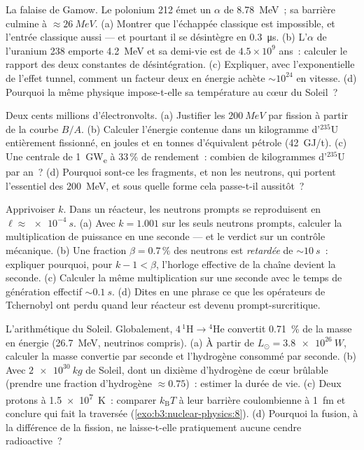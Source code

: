\begin{exercise}[$\star\star$]\label{exo:b3:nuclear-physics:8}
La falaise de Gamow. Le polonium 212 émet un $\alpha$ de
\qty{8.78}{MeV}~; sa barrière culmine à $\approx\qty{26}{MeV}$. (a)
Montrer que l'échappée classique est impossible, et l'entrée
classique aussi --- et pourtant il se désintègre en
\qty{0.3}{\micro s}. (b) L'$\alpha$ de l'uranium 238 emporte
\qty{4.2}{MeV} et sa demi-vie est de $4.5\times10^9$ ans~: calculer
le rapport des deux constantes de désintégration. (c) Expliquer, avec
l'exponentielle de l'effet tunnel, comment un facteur deux en énergie
achète $\sim10^{24}$ en vitesse. (d) Pourquoi la même physique
impose-t-elle sa température au cœur du Soleil~?
\end{exercise}

\begin{exercise}[$\star\star$]\label{exo:b3:nuclear-physics:9}
Deux cents millions d'électronvolts. (a) Justifier les
$\qty{200}{MeV}$ par fission à partir de la courbe $B/A$. (b)
Calculer l'énergie contenue dans un kilogramme d'$^{235}$U
entièrement fissionné, en joules et en tonnes d'équivalent pétrole
(\qty{42}{GJ/t}). (c) Une centrale de \qty{1}{GW_e} à 33\,\% de
rendement~: combien de kilogrammes d'$^{235}$U par an~? (d) Pourquoi
sont-ce les fragments, et non les neutrons, qui portent l'essentiel
des \qty{200}{MeV}, et sous quelle forme cela passe-t-il aussitôt~?
\end{exercise}

\begin{exercise}[$\star\star\star$]\label{exo:b3:nuclear-physics:10}
Apprivoiser $k$. Dans un réacteur, les neutrons prompts se
reproduisent en $\ell
\approx \qty{e-4}{s}$. (a) Avec $k = 1.001$ sur les seuls neutrons
prompts, calculer la multiplication de puissance en une seconde ---
et le verdict sur un contrôle mécanique. (b) Une fraction $\beta =
0.7\,\%$ des neutrons est \emph{retardée} de $\sim\qty{10}{s}$~:
expliquer pourquoi, pour $k - 1 < \beta$, l'horloge effective de la
chaîne devient la seconde. (c) Calculer la même multiplication sur
une seconde avec le temps de génération effectif
$\sim\qty{0.1}{s}$. (d) Dites en une phrase ce que les opérateurs de
Tchernobyl ont perdu quand leur réacteur est devenu
prompt-surcritique.
\end{exercise}

\begin{exercise}[$\star\star\star$]\label{exo:b3:nuclear-physics:11}
L'arithmétique du Soleil. Globalement,
$4\,^1\text{H} \to {}^4\text{He}$ convertit \qty{0.71}{\percent} de
la masse en énergie (\qty{26.7}{MeV}, neutrinos compris). (a) À
partir de $L_\odot =
\qty{3.8e26}{W}$, calculer la masse convertie par seconde et
l'hydrogène consommé par seconde. (b) Avec $\qty{2e30}{kg}$ de
Soleil, dont un dixième d'hydrogène de cœur brûlable (prendre une
fraction d'hydrogène $\approx0.75$)~: estimer la durée de vie. (c)
Deux protons à \qty{1.5e7}{K}~: comparer $k_{\text{B}}T$ à leur
barrière coulombienne à \qty{1}{fm} et conclure qui fait la traversée
(\cref{exo:b3:nuclear-physics:8}). (d) Pourquoi la fusion, à la
différence de la fission, ne laisse-t-elle pratiquement aucune cendre
radioactive~?
\end{exercise}

